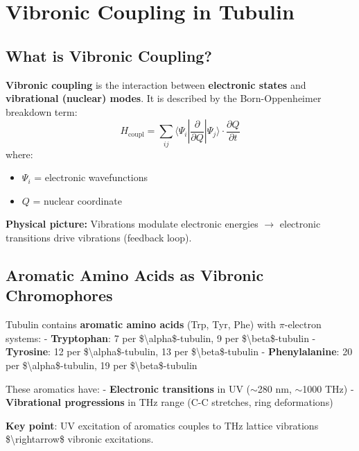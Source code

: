 \section{Vibronic Coupling in Tubulin}
\label{sec:vibronic-coupling}

\subsection{What is Vibronic Coupling?}
\label{subsec:vibronic-definition}

\textbf{Vibronic coupling} is the interaction between \textbf{electronic states} and \textbf{vibrational (nuclear) modes}. It is described by the Born-Oppenheimer breakdown term:
\begin{equation}
\label{eq:vibronic-coupling}
H_{\text{coupl}} = \sum_{ij} \langle \Psi_i | \frac{\partial}{\partial Q} | \Psi_j \rangle \cdot \frac{\partial Q}{\partial t}
\end{equation}
where:
\begin{itemize}
\item $\Psi_i$ = electronic wavefunctions
\item $Q$ = nuclear coordinate
\end{itemize}

\textbf{Physical picture:} Vibrations modulate electronic energies $\rightarrow$ electronic transitions drive vibrations (feedback loop).

\subsection{Aromatic Amino Acids as Vibronic
Chromophores}\label{aromatic-amino-acids-as-vibronic-chromophores}

Tubulin contains \textbf{aromatic amino acids} (Trp, Tyr, Phe) with
\(\pi\)-electron systems: - \textbf{Tryptophan}: 7 per
\$\textbackslash alpha\$-tubulin, 9 per \$\textbackslash beta\$-tubulin
- \textbf{Tyrosine}: 12 per \$\textbackslash alpha\$-tubulin, 13 per
\$\textbackslash beta\$-tubulin - \textbf{Phenylalanine}: 20 per
\$\textbackslash alpha\$-tubulin, 19 per \$\textbackslash beta\$-tubulin

These aromatics have: - \textbf{Electronic transitions} in UV
($\sim$280 nm, $\sim$1000 THz) - \textbf{Vibrational
progressions} in THz range (C-C stretches, ring deformations)

\textbf{Key point}: UV excitation of aromatics couples to THz lattice
vibrations \$\textbackslash rightarrow\$ vibronic excitations.

